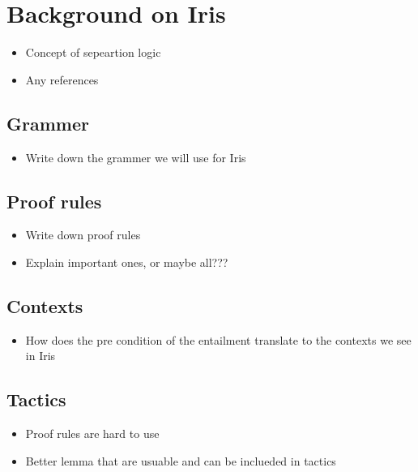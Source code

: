 \documentclass[thesis.tex]{subfiles}
\begin{document}
\chapter{Background on Iris}



\begin{itemize}
  \item Concept of sepeartion logic
  \item Any references
\end{itemize}

\section{Grammer}
\begin{itemize}
  \item Write down the grammer we will use for Iris
\end{itemize}
\section{Proof rules}
\begin{itemize}
  \item Write down proof rules
  \item Explain important ones, or maybe all???
\end{itemize}

\section{Contexts}
\begin{itemize}
  \item How does the pre condition of the entailment translate to the contexts we see in Iris
\end{itemize}

\section{Tactics}
\begin{itemize}
  \item Proof rules are hard to use
  \item Better lemma that are usuable and can be inclueded in tactics
\end{itemize}
\end{document}
